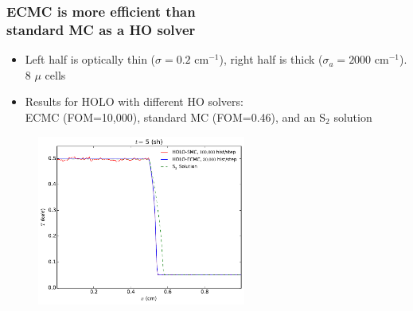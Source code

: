 \documentclass[xcolor=dvipsnames,hyperref={pdfpagelabels=false},unknownkeysallowed]{beamer}
\newcommand{\colg}[1]{{\color{ForestGreen} #1}}
\newcommand{\colb}[1]{{\color{blue} #1}}
\newcommand{\colG}[1]{{\color{Gray!110} #1}}
\newcommand{\colr}[1]{{\color{red} #1}}
\newlength{\wideitemsep}
\let\olditem\item
\renewcommand{\item}{\setlength{\itemsep}{\wideitemsep}\olditem}
\begin{document}
%

\begin{frame}
    \frametitle{ECMC is more efficient than\\
 standard MC  as a HO solver }
{\addtolength\leftmargini{-0.345in}
    \centering
        \fontsize{10.0pt}{10.2pt}\selectfont
        \vspace{0.2in}
        \begin{itemize}
            \item Left half is optically thin ($\sigma\!=\!0.2$ cm$^{-1}$),
                right half is thick ($\sigma_a\!=\!2000$ cm$^{-1}$). \colG{8 $\mu$ cells}
            \item Results for HOLO with different HO solvers:\\ \colb{ECMC} (FOM=10,000),  \colr{ standard MC}
            (FOM=0.46), and an \colg{ S$_2$}
            solution
        \end{itemize}
    \begin{figure}
        \vspace{-0.1in}
    \includegraphics[width=0.6099\textwidth]{two_mat_ho_compare.pdf}
    \centering
    \end{figure}
}
\end{frame}
\end{document}
